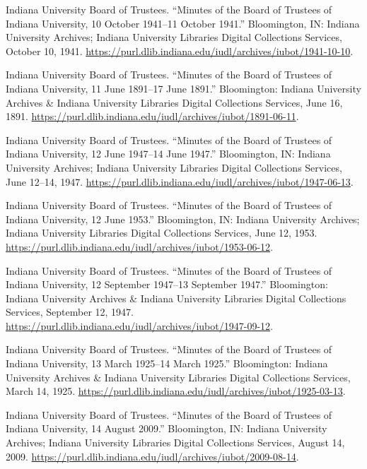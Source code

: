 \documentclass[
  american,
  letterpaper,
]{scrreprt}
\newlength{\cslhangindent}
\newenvironment{CSLReferences}[2] %
 {\begin{list}{}{%
  \setlength{\itemindent}{0pt}
  \setlength{\leftmargin}{0pt}
  \setlength{\parsep}{0pt}
  \ifodd #1
   \setlength{\leftmargin}{\cslhangindent}
   \setlength{\itemindent}{-1\cslhangindent}
  \fi
  \setlength{\itemsep}{#2\baselineskip}}}
 {\end{list}}
\begin{document}
\begin{CSLReferences}{1}{0}
Indiana University Board of Trustees. {``Minutes of the Board of
Trustees of Indiana University, 10 October 1941--11 October 1941.''}
Bloomington, IN: Indiana University Archives; Indiana University
Libraries Digital Collections Services, October 10, 1941.
\url{https://purl.dlib.indiana.edu/iudl/archives/iubot/1941-10-10}.

Indiana University Board of Trustees. {``Minutes of the Board of
Trustees of Indiana University, 11 June 1891--17 June 1891.''}
Bloomington: Indiana University Archives \& Indiana University Libraries
Digital Collections Services, June 16, 1891.
\url{https://purl.dlib.indiana.edu/iudl/archives/iubot/1891-06-11}.

Indiana University Board of Trustees. {``Minutes of the Board of
Trustees of Indiana University, 12 June 1947--14 June 1947.''}
Bloomington, IN: Indiana University Archives; Indiana University
Libraries Digital Collections Services, June 12--14, 1947.
\url{https://purl.dlib.indiana.edu/iudl/archives/iubot/1947-06-13}.

Indiana University Board of Trustees. {``Minutes of the Board of
Trustees of Indiana University, 12 June 1953.''} Bloomington, IN:
Indiana University Archives; Indiana University Libraries Digital
Collections Services, June 12, 1953.
\url{https://purl.dlib.indiana.edu/iudl/archives/iubot/1953-06-12}.

Indiana University Board of Trustees. {``Minutes of the Board of
Trustees of Indiana University, 12 September 1947--13 September 1947.''}
Bloomington: Indiana University Archives \& Indiana University Libraries
Digital Collections Services, September 12, 1947.
\url{https://purl.dlib.indiana.edu/iudl/archives/iubot/1947-09-12}.

Indiana University Board of Trustees. {``Minutes of the Board of
Trustees of Indiana University, 13 March 1925--14 March 1925.''}
Bloomington: Indiana University Archives \& Indiana University Libraries
Digital Collections Services, March 14, 1925.
\url{https://purl.dlib.indiana.edu/iudl/archives/iubot/1925-03-13}.

Indiana University Board of Trustees. {``Minutes of the Board of
Trustees of Indiana University, 14 August 2009.''} Bloomington, IN:
Indiana University Archives; Indiana University Libraries Digital
Collections Services, August 14, 2009.
\url{https://purl.dlib.indiana.edu/iudl/archives/iubot/2009-08-14}.


\end{CSLReferences}
\end{document}

